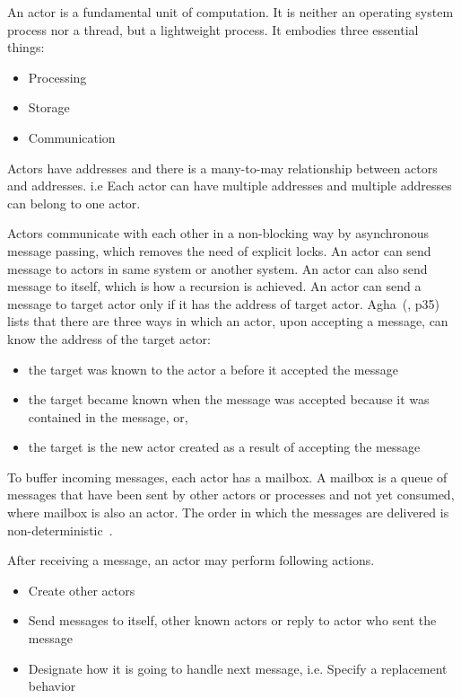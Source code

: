   An actor is a fundamental unit of computation. It is neither an operating system process nor a thread, but a lightweight process. It embodies three essential things:
\begin{itemize}
  \item Processing
  \item Storage
  \item Communication
\end{itemize}
  Actors have addresses and there is a many-to-may relationship between actors and addresses. i.e Each actor can have multiple addresses and multiple addresses can belong to one actor.

  Actors communicate with each other in a non-blocking way by asynchronous message passing, which removes the need of explicit locks. An actor can send message to actors in same system or another system. An actor can also send message to itself, which is how a recursion is achieved. An actor can send a message to target actor only if it has the address of target actor. Agha~(\cite{agha}, p35) lists that there are three ways in which an actor, upon accepting a message, can know the address of the target actor:
  \begin{itemize}
    \item the target was known to the actor a before it accepted the message
    \item the target became known when the message was accepted because it was contained in the message, or,
    \item the target is the new actor created as a result of accepting the message
  \end{itemize}

  To buffer incoming messages, each actor has a mailbox. A mailbox is a queue of messages that have been sent by other actors or processes and not yet consumed, where mailbox is also an actor. The order in which the messages are delivered is non-deterministic~\cite{hewittVideo}.

After receiving a message, an actor may perform following actions.~\parencite{hewitt}
\begin{itemize}
  \item Create other actors
  \item Send messages to itself, other known actors or reply to actor who sent the message
  \item Designate how it is going to handle next message, i.e. Specify a replacement behavior
\end{itemize}

